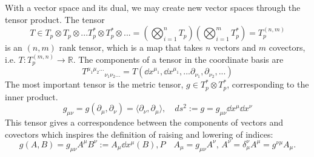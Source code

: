 With a vector space and its dual, we may create new vector spaces through the tensor product.
The tensor
\begin{equation*}
    T \in T_p \otimes T_p \otimes ... T^*_p \otimes T^*_p \otimes ... = \left(\bigotimes_{i=1}^n T_p\right) \left(\bigotimes_{i=1}^m T^*_p\right) = T_p^{(n, m)}
\end{equation*}
is an $(n, m)$ rank tensor, which is a map that takes $n$ vectors and $m$ covectors, i.e. $T: T_p^{(m, n)} \rightarrow \mathbb{R}$.
The components of a tensor in the coordinate basis are
\begin{equation*}
    T^{\mu_1 \mu_2...}{}_{\nu_1 \nu_2 ...} = T(\dd x^{\mu_1}, \dd x^{\mu_1}, ... \partial_{\nu_1}, \partial_{\nu_2}, ...)
\end{equation*}
The most important tensor is the metric tensor, $g \in T^*_p \otimes T^*_p$, corresponding to the inner product.
\begin{equation*}
    g_{\mu\nu} = g(\partial_\mu, \partial_\nu) = \langle \partial_\nu, \partial_\mu \rangle, \quad ds^2 := g = g_{\mu\nu} \dd x^\mu \dd x^\nu
\end{equation*}
This tensor gives a correspondence between the components of vectors and covectors which inspires the definition of raising and lowering of indices:
\begin{equation*}
    g(A, B) = g_{\mu \nu} A^\mu B^\nu := A_\mu \dd x^\mu(B), P\quad A_\mu = g_{\mu \nu} A^\nu, \, A^\nu = \delta^\nu_\mu A^\mu = g^{\nu\mu} A_\mu.
\end{equation*}

